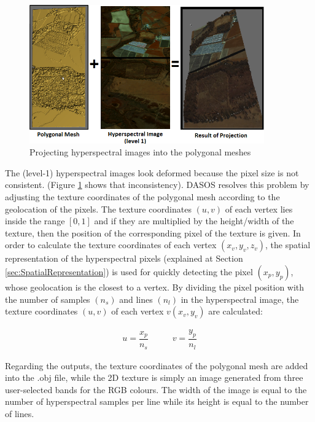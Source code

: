 \documentclass{subfiles}
\begin{document}
	
		 \begin{figure} [h!]
		 	\centering
		 	\includegraphics[width=0.9\textwidth]{img/ProjectingHyperspectral}
		 	\caption{Projecting hyperspectral images into the polygonal meshes}
		 	\label{fig:ProjectingHyperspectral}
		 \end{figure}
		 

	
			
	\par  The (level-1) hyperspectral images look deformed because the pixel size is not consistent. {\color{blue} (Figure \ref{fig:ProjectingHyperspectral} shows that inconsistency).}
	 DASOS resolves this problem by adjusting the texture coordinates of the polygonal mesh according to the geolocation of the pixels. The texture coordinates $(u, v)$ of each vertex lies inside the range $[0, 1]$ and if they are multiplied by the height/width of the texture, then the position of the corresponding pixel of the texture is given. In order to calculate the texture coordinates of each vertex $(x_v, y_v, z_v)$, the spatial representation of the hyperspectral pixels (explained at Section \ref{sec:SpatialRepresentation}) is used for quickly detecting the pixel $(x_p, y_p )$, whose geolocation is the closest to a vertex. By dividing the pixel position with the number of samples $(n_s)$ and lines $(n_l)$ in the hyperspectral image, the texture coordinates $(u, v)$ of each vertex $v(x_v , y_v)$ are calculated:
		
	\begin{eqnarray}
	u=\dfrac{x_p}{n_s} \;\;\;\;\;\;\;\;\;\; v=\dfrac{y_p}{n_l}
	\end{eqnarray}
	
	\par Regarding the outputs, the texture coordinates of the polygonal mesh are added into the .obj file, while the 2D texture is simply an image generated from three user-selected bands for the RGB colours. The width of the image is equal to the number of hyperspectral samples per line while its height is equal to the number of lines.
	
\end{document}
